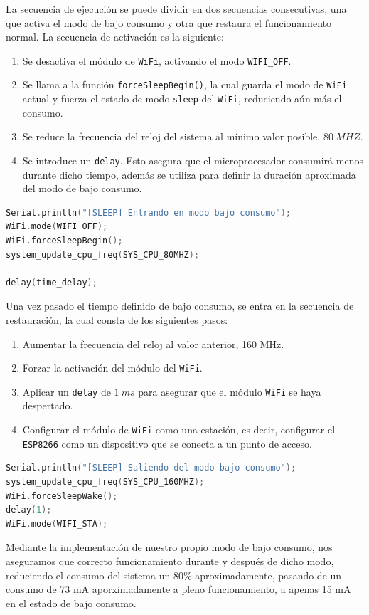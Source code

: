 La secuencia de ejecución se puede dividir en dos secuencias consecutivas, una que activa el modo de bajo consumo y otra que restaura el funcionamiento normal. La secuencia de activación es la siguiente:

\begin{enumerate}
    \item Se desactiva el módulo de \texttt{WiFi}, activando el modo \texttt{WIFI\_OFF}.
    \item Se llama a la función \texttt{forceSleepBegin()}, la cual guarda el modo de \texttt{WiFi} actual y fuerza el estado de modo \texttt{sleep} del \texttt{WiFi}, reduciendo aún más el consumo.
    \item Se reduce la frecuencia del reloj del sistema al mínimo valor posible, $80\ MHZ$.
    \item Se introduce un \texttt{delay}. Esto asegura que el microprocesador consumirá menos durante dicho tiempo, además se utiliza para definir la duración aproximada del modo de bajo consumo.
\end{enumerate}

\begin{lstlisting}[captionpos=b, caption={Activación modo bajo consumo}, language=c++]
Serial.println("[SLEEP] Entrando en modo bajo consumo");
WiFi.mode(WIFI_OFF);
WiFi.forceSleepBegin();
system_update_cpu_freq(SYS_CPU_80MHZ);

delay(time_delay);
\end{lstlisting}

Una vez pasado el tiempo definido de bajo consumo, se entra en la secuencia de restauración, la cual consta de los siguientes pasos:

\begin{enumerate}
    \item Aumentar la frecuencia del reloj al valor anterior, 160 MHz.
    \item Forzar la activación del módulo del \texttt{WiFi}.
    \item Aplicar un \texttt{delay} de $1\ ms$ para asegurar que el módulo \texttt{WiFi} se haya despertado.
    \item Configurar el módulo de \texttt{WiFi} como una estación, es decir, configurar el \texttt{ESP8266} como un dispositivo que se conecta a un punto de acceso.
\end{enumerate}

\begin{lstlisting}[captionpos=b, caption={Restauración modo bajo consumo}, language=c++]
Serial.println("[SLEEP] Saliendo del modo bajo consumo");
system_update_cpu_freq(SYS_CPU_160MHZ);
WiFi.forceSleepWake();
delay(1);
WiFi.mode(WIFI_STA);
\end{lstlisting}

Mediante la implementación de nuestro propio modo de bajo consumo, nos aseguramos que correcto funcionamiento durante y después de dicho modo, reduciendo el consumo del sistema un 80\% aproximadamente, pasando de un consumo de 73 mA aporximadamente a pleno funcionamiento, a apenas 15 mA en el estado de bajo consumo.
